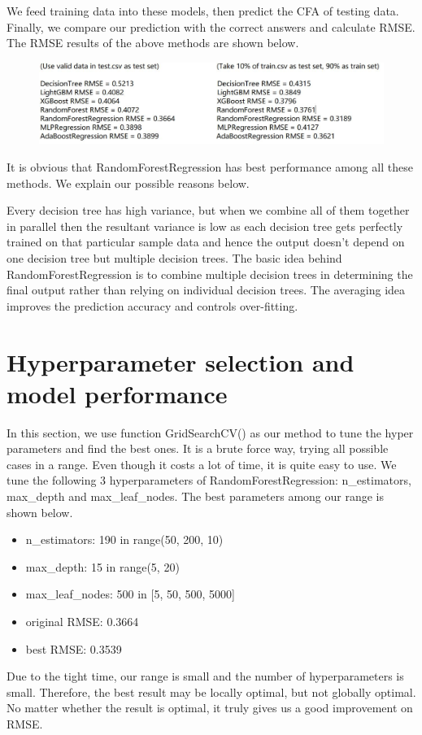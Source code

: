 \documentclass{article}
\begin{document}
We feed training data into these models, then predict the CFA of testing data. Finally, we compare our prediction with the correct answers and calculate RMSE. The RMSE results of the above methods are shown below.
\begin{figure}[h]
	\centering
	{\includegraphics[width=12cm]{result.JPG}}
\end{figure}

It is obvious that RandomForestRegression has best performance among all these methods. We explain our possible reasons below.

Every decision tree has high variance, but when we combine all of them together in parallel then the resultant variance is low as each decision tree gets perfectly trained on that particular sample data and hence the output doesn't depend on one decision tree but multiple decision trees. 
The basic idea behind RandomForestRegression is to combine multiple decision trees in determining the final output rather than relying on individual decision trees. The averaging idea improves the prediction
accuracy and controls over-fitting.
\section{Hyperparameter selection and model performance}
In this section, we use function GridSearchCV() as our method to tune the hyper parameters and find the best ones. It is a brute force way, trying all possible cases in a range. Even though it costs a lot of time, it is quite easy to use. 
We tune the following 3 hyperparameters of RandomForestRegression: n\_estimators, max\_depth and max\_leaf\_nodes. The best parameters among our range is shown below.
\begin{itemize}
  \item n\_estimators: 190 in range(50, 200, 10)
  \item max\_depth: 15 in range(5, 20)
  \item max\_leaf\_nodes: 500 in [5, 50, 500, 5000]
  \item original RMSE: 0.3664
  \item best RMSE: 0.3539
\end{itemize}
Due to the tight time, our range is small and the number of hyperparameters is small. Therefore, the best result may be locally optimal, but not globally optimal. No matter whether the result is optimal, it truly gives us a good improvement on RMSE.
\end{document}
